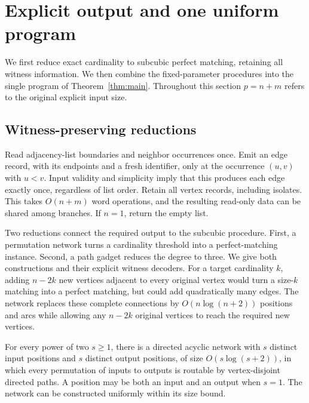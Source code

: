 \section{Explicit output and one uniform program}\label{sec:uniformization}

We first reduce exact cardinality to subcubic perfect matching, retaining
all witness information. We then combine the fixed-parameter procedures
into the single program of Theorem~\ref{thm:main}. Throughout this section
$p=n+m$ refers to the original explicit input size.

\subsection{Witness-preserving reductions}

Read adjacency-list boundaries and neighbor occurrences once. Emit an edge
record, with its endpoints and a fresh identifier, only at the occurrence
$(u,v)$ with $u<v$. Input validity and simplicity imply that this produces
each edge exactly once, regardless of list order. Retain all vertex records,
including isolates. This takes $O(n+m)$ word operations, and the resulting
read-only data can be shared among branches. If $n=1$, return the empty list.

Two reductions connect the required output to the subcubic procedure.
First, a permutation network turns a cardinality threshold into a
perfect-matching instance. Second, a path gadget reduces the degree to
three. We give both constructions and their explicit witness decoders.
For a target cardinality $k$, adding $n-2k$ new vertices adjacent to every
original vertex would turn a size-$k$ matching into a perfect matching,
but could add quadratically many edges. The network replaces these
complete connections by $O(n\log(n+2))$ positions and arcs while allowing
any $n-2k$ original vertices to reach the required new vertices.

\begin{lemma}\label{uniform:network}
For every power of two $s\ge1$, there is a directed acyclic network with
$s$ distinct input positions and $s$ distinct output positions, of size
$O(s\log(s+2))$, in which every permutation of inputs to outputs is routable
by vertex-disjoint directed paths. A position may be both an input and an
output when $s=1$. The network can be constructed uniformly within its size
bound.
\end{lemma}

